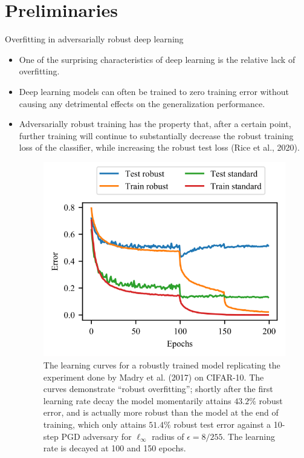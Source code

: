 \section{Preliminaries}

\begin{frame}{Overfitting in adversarially robust deep learning}
    \begin{itemize}
        \item One of the surprising characteristics of deep learning is the relative lack of overfitting. 
        \item Deep learning models can often be trained to zero training error without causing any detrimental effects on the generalization performance.
        \item Adversarially robust training has the property that, after a certain point, further training will continue to substantially decrease the robust training loss of the classifier, while increasing the robust test loss (Rice et al., 2020).
        \begin{figure}
            \begin{minipage}[c]{0.55\linewidth}
                \includegraphics[height=.5\textheight]{pic/cifar10_curve.png}
            \end{minipage}
            \begin{minipage}[c]{0.4\linewidth}
                \caption{The learning curves for a robustly trained model replicating the experiment done by Madry et al. (2017) on CIFAR-10. The curves demonstrate “robust overfitting”; shortly after the first learning rate decay the model momentarily attains $43.2\%$ robust error, and is actually more robust than the model at the end of training, which only attains $51.4\%$ robust test error against a 10-step PGD adversary for $\ell_\infty$ radius of $\epsilon = 8/255$. The learning rate is decayed at 100 and 150 epochs.}\label{fig:cifar10_curve}
            \end{minipage}
        \end{figure}
    \end{itemize}
\end{frame}

